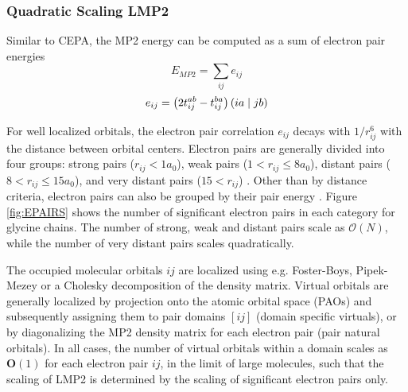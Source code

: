 \subsubsection{Quadratic Scaling LMP2}

Similar to CEPA, the MP2 energy can be computed as a sum of electron pair energies
\begin{equation}
E_{MP2} = \sum_{ij} e_{ij}
\end{equation}
\begin{equation}
e_{ij} = \left( 2t_{ij}^{ab} - t_{ij}^{ba} \right) \left( ia \mid jb \right) 
\end{equation} 
 
For well localized orbitals, the electron pair correlation $e_{ij}$ decays with $1/r_{ij}^6$ with the distance between orbital centers. Electron pairs are generally divided into four groups: strong pairs ($r_{ij} < 1a_0$), weak pairs ($1 < r_{ij} \leq 8 a_0$), distant pairs ($8 < r_{ij} \leq 15 a_0$), and very distant pairs ($15 < r_{ij}$) \cite{Sch1999}. Other than by distance criteria, electron pairs can also be grouped by their pair energy \cite{Nee2009}. Figure \ref{fig:EPAIRS} shows the number of significant electron pairs in each category for glycine chains. The number of strong, weak and distant pairs scale as $\mathcal{O}(N)$, while the number of very distant pairs scales quadratically. 

The occupied molecular orbitals $ij$ are localized using e.g. Foster-Boys, Pipek-Mezey or a Cholesky decomposition of the density matrix. Virtual orbitals are generally localized by projection onto the atomic orbital space (PAOs) and subsequently assigning them to pair domains $[ij]$ (domain specific virtuals), or by diagonalizing the MP2 density matrix for each electron pair (pair natural orbitals).  In all cases, the number of virtual orbitals within a domain scales as $\mathbf{O}(1)$ for each electron pair $ij$, in the limit of large molecules, such that the scaling of LMP2 is determined by the scaling of significant electron pairs only.

